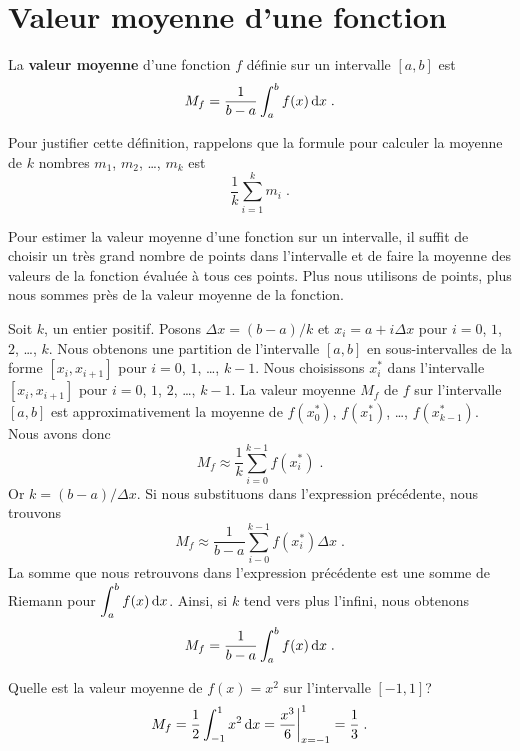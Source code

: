 {

\section{Valeur moyenne d'une fonction }

\begin{defn} 
La {\bfseries valeur moyenne} d'une fonction $f$ définie sur un intervalle
$[a,b]$ est
\[
M_f = \frac{1}{b-a} \int_a^b f(x)\,\mathrm{d}x \; .
\]
\end{defn}

Pour justifier cette définition, rappelons que la formule pour calculer la
moyenne de $k$ nombres $m_1$, $m_2$, \ldots, $m_k$ est
\[
\frac{1}{k} \sum_{i=1}^k m_i \; .
\]

Pour estimer la valeur moyenne d'une fonction sur un intervalle, il suffit de
choisir un très grand nombre de points dans l'intervalle et de faire la
moyenne des valeurs de la fonction évaluée à tous ces points.  Plus nous
utilisons de points, plus nous sommes près de la valeur moyenne de la fonction.

Soit $k$, un entier positif.  Posons $\Delta x = (b-a)/k$ et
$x_i = a + i \Delta x$ pour $i=0$, $1$, $2$, \ldots, $k$.  Nous obtenons une
partition de l'intervalle $[a,b]$ en sous-intervalles de la forme
$[x_i,x_{i+1}]$ pour $i=0$, $1$, \ldots, $k-1$.  Nous choisissons $x_i^\ast$
dans l'intervalle $[x_i,x_{i+1}]$ pour $i=0$, $1$, $2$, \ldots, $k-1$.  La
valeur moyenne $M_f$ de $f$ sur l'intervalle $[a,b]$ est approximativement la
moyenne de $f(x_0^\ast)$, $f(x_1^\ast)$, \ldots, $f(x_{k-1}^\ast)$.
Nous avons donc
\[
M_f \approx \frac{1}{k} \sum_{i=0}^{k-1} f(x_i^\ast) \; .
\]
Or $k = (b-a)/\Delta x$.  Si nous substituons dans l'expression
précédente, nous trouvons
\[
M_f \approx \frac{1}{b-a} \sum_{i-0}^{k-1} f(x_i^\ast) \Delta x \; .
\]
La somme que nous retrouvons dans l'expression précédente est une somme de
Riemann pour $\displaystyle \int_a^b f(x) \,\mathrm{d}x$.  Ainsi, si $k$ tend vers
plus l'infini, nous obtenons
\[
M_f = \frac{1}{b-a} \int_a^b f(x) \,\mathrm{d}x \; .
\]

\begin{egg}
Quelle est la valeur moyenne de $f(x)=x^2$ sur l'intervalle $[-1,1]$?
\[
M_f = \frac{1}{2} \int_{-1}^1 x^2 \,\mathrm{d}x =
\frac{x^3}{6}\bigg|_{x=-1}^1 = \frac{1}{3} \; .
\]
\end{egg}

}

